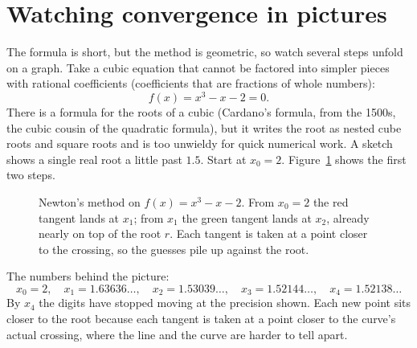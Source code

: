 \section{Watching convergence in pictures}
\label{ch19:pictures}

The formula is short, but the method is geometric, so watch several steps unfold
on a graph. Take a cubic equation that cannot be factored into simpler pieces with
rational coefficients (coefficients that are fractions of whole numbers):
\[
  f(x) = x^3 - x - 2 = 0.
\]
There is a formula for the roots of a cubic (Cardano's formula, from the 1500s,
the cubic cousin of the quadratic formula), but it writes the root as nested cube
roots and square roots and is too unwieldy for quick numerical work. A sketch shows
a single real root a little past $1.5$. Start at $x_0 = 2$.
Figure~\ref{ch19:fig-cubic} shows the first two steps.

\begin{figure}[H]
\centering
{}
\caption{Newton's method on $f(x)=x^3-x-2$. From $x_0=2$ the
red tangent lands at $x_1$; from $x_1$ the green tangent lands at $x_2$, already
nearly on top of the root $r$. Each tangent is taken at a point closer to the
crossing, so the guesses pile up against the root.}
\label{ch19:fig-cubic}
\end{figure}

The numbers behind the picture:
\[
  x_0 = 2, \quad x_1 = 1.63636\ldots, \quad x_2 = 1.53039\ldots,
  \quad x_3 = 1.52144\ldots, \quad x_4 = 1.52138\ldots
\]
By $x_4$ the digits have stopped moving at the precision shown. Each new point
sits closer to the root because each tangent is taken at a point closer to the
curve's actual crossing, where the line and the curve are harder to tell apart.

